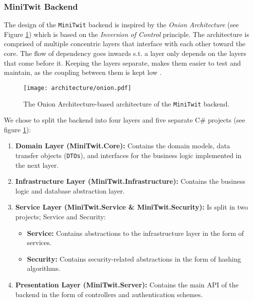 \subsubsection{MiniTwit Backend}
\label{sec:minitwit-backend-architecture}

The design of the \texttt{MiniTwit} backend is inspired by the \textit{Onion Architecture} (see Figure \ref{fig:backend-onion}) which is based on the \textit{Inversion of Control} principle. The architecture is comprised of multiple concentric layers that interface with each other toward the core. The flow of dependency goes inwards s.t. a layer only depends on the layers that come before it. Keeping the layers separate, makes them easier to test and maintain, as the coupling between them is kept low \cite{onion-architecture}.

\begin{figure}[H]
    \centering
    \texttt{[image: architecture/onion.pdf]}
    \caption{The Onion Architecture-based architecture of the \texttt{MiniTwit} backend.}
    \label{fig:backend-onion}
\end{figure}
\vspace{-0.3cm}

We chose to split the backend into four layers and five separate C\# projects (see figure \ref{fig:backend-onion}):

\begin{enumerate}
    \item \textbf{Domain Layer (MiniTwit.Core):} Contains the domain models, data transfer objects (\texttt{DTOs}), and interfaces for the business logic implemented in the next layer.
    \item \textbf{Infrastructure Layer (MiniTwit.Infrastructure):} Contains the business logic and database abstraction layer.
    \item \textbf{Service Layer (MiniTwit.Service \& MiniTwit.Security):} Is split in two projects; Service and Security:
    \begin{itemize}[$\circ$]
        \item \textbf{Service:} Contains abstractions to the infrastructure layer in the form of services.
        \item \textbf{Security:} Contains security-related abstractions in the form of hashing algorithms.
    \end{itemize}
    \item \textbf{Presentation Layer (MiniTwit.Server):} Contains the main API of the backend in the form of controllers and authentication schemes.
\end{enumerate}

